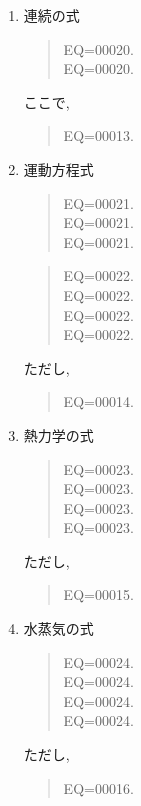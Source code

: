 \begin{enumerate}
\item 連続の式

\begin{quote}
\nonumber
EQ=00020.\\
EQ=00020.
\end{quote}
%
ここで,
\begin{quote}
EQ=00013.
\end{quote}

\item 運動方程式

\begin{quote}
\nonumber
EQ=00021.\\
\nonumber
EQ=00021.\\
EQ=00021.
\end{quote}
%
\begin{quote}
\nonumber
EQ=00022.\\
\nonumber
EQ=00022.\\
\nonumber
EQ=00022.\\
EQ=00022.
\end{quote}
%
ただし,
%
\begin{quote}
EQ=00014.
\end{quote}

\item 熱力学の式

\begin{quote}
\nonumber
EQ=00023.\\
\nonumber
EQ=00023.\\
\nonumber
EQ=00023.\\
EQ=00023.
\end{quote}
%
ただし,
%
\begin{quote}
EQ=00015.
\end{quote}



\item 水蒸気の式

\begin{quote}
\nonumber
EQ=00024.\\
\nonumber
EQ=00024.\\
\nonumber
EQ=00024.\\
EQ=00024.
\end{quote}

ただし,
%
\begin{quote}
EQ=00016.
\end{quote}



\end{enumerate}

